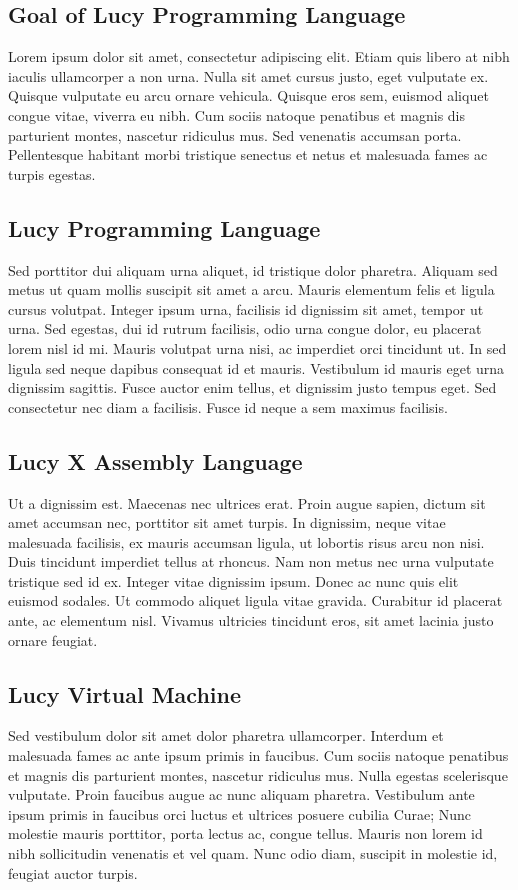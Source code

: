\subsection{Goal of Lucy Programming Language}
Lorem ipsum dolor sit amet, consectetur adipiscing elit. Etiam quis libero at nibh iaculis ullamcorper a non urna. Nulla sit amet cursus justo, eget vulputate ex. Quisque vulputate eu arcu ornare vehicula. Quisque eros sem, euismod aliquet congue vitae, viverra eu nibh. Cum sociis natoque penatibus et magnis dis parturient montes, nascetur ridiculus mus. Sed venenatis accumsan porta. Pellentesque habitant morbi tristique senectus et netus et malesuada fames ac turpis egestas.


\subsection{Lucy Programming Language}
Sed porttitor dui aliquam urna aliquet, id tristique dolor pharetra. Aliquam sed metus ut quam mollis suscipit sit amet a arcu. Mauris elementum felis et ligula cursus volutpat. Integer ipsum urna, facilisis id dignissim sit amet, tempor ut urna. Sed egestas, dui id rutrum facilisis, odio urna congue dolor, eu placerat lorem nisl id mi. Mauris volutpat urna nisi, ac imperdiet orci tincidunt ut. In sed ligula sed neque dapibus consequat id et mauris. Vestibulum id mauris eget urna dignissim sagittis. Fusce auctor enim tellus, et dignissim justo tempus eget. Sed consectetur nec diam a facilisis. Fusce id neque a sem maximus facilisis.

\subsection{Lucy X Assembly Language}
Ut a dignissim est. Maecenas nec ultrices erat. Proin augue sapien, dictum sit amet accumsan nec, porttitor sit amet turpis. In dignissim, neque vitae malesuada facilisis, ex mauris accumsan ligula, ut lobortis risus arcu non nisi. Duis tincidunt imperdiet tellus at rhoncus. Nam non metus nec urna vulputate tristique sed id ex. Integer vitae dignissim ipsum. Donec ac nunc quis elit euismod sodales. Ut commodo aliquet ligula vitae gravida. Curabitur id placerat ante, ac elementum nisl. Vivamus ultricies tincidunt eros, sit amet lacinia justo ornare feugiat.

\subsection{Lucy Virtual Machine}
Sed vestibulum dolor sit amet dolor pharetra ullamcorper. Interdum et malesuada fames ac ante ipsum primis in faucibus. Cum sociis natoque penatibus et magnis dis parturient montes, nascetur ridiculus mus. Nulla egestas scelerisque vulputate. Proin faucibus augue ac nunc aliquam pharetra. Vestibulum ante ipsum primis in faucibus orci luctus et ultrices posuere cubilia Curae; Nunc molestie mauris porttitor, porta lectus ac, congue tellus. Mauris non lorem id nibh sollicitudin venenatis et vel quam. Nunc odio diam, suscipit in molestie id, feugiat auctor turpis.


